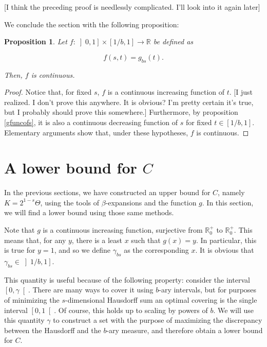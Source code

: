 \documentclass[11pt, reqno]{amsart}
\newcommand{\R}{\mathbb{R}}
\newtheorem{prop}{Proposition}
\begin{document}
[I think the preceding proof is needlessly complicated. I'll look into it again later]

We conclude the section with the following proposition:

\begin{prop}
Let $f : \left]0, 1\right] \times \left[1/b, 1\right] \to \R$ be defined as

\[f(s, t) = g_{bs}(t).\]

Then, $f$ is continuous.
\end{prop}

\begin{proof}
Notice that, for fixed $s$, $f$ is a continuous increasing function of $t$. [I just realized. I don't prove this anywhere. It is obvious? I'm pretty certain it's true, but I probably should prove this somewhere.] Furthermore, by proposition \ref{gfuncofs}, it is also a continuous decreasing function of $s$ for fixed $t \in \left[1/b, 1 \right]$. Elementary arguments show that, under these hypotheses, $f$ is continuous. %
\end{proof}

\section{A lower bound for $C$}\label{seclowerbound}

In the previous sections, we have constructed an upper bound for $C$, namely $K = 2^{1-s} \Theta$, using the tools of $\beta$-expansions and the function $g$. In this section, we will find a lower bound using those same methods.

Note that $g$ is a continuous increasing function, surjective from $\R^+_0$ to $\R^+_0$. This means that, for any $y$, there is a least $x$ such that $g(x) = y$. In particular, this is true for $y = 1$, and so we define $\gamma_{bs}$ as the corresponding $x$. It is obvious that $\gamma_{bs} \in \left] 1/b, 1 \right]$.

This quantity is useful because of the following property: consider the interval $\left[0, \gamma \right[$. There are many ways to cover it using $b$-ary intervals, but for purposes of minimizing the $s$-dimensional Hausdorff sum an optimal covering is the single interval $\left[0, 1 \right[$. Of course, this holds up to scaling by powers of $b$. We will use this quantity $\gamma$ to construct a set with the purpose of maximizing the discrepancy between the Hausdorff and the $b$-ary measure, and therefore obtain a lower bound for $C$.
\end{document}

